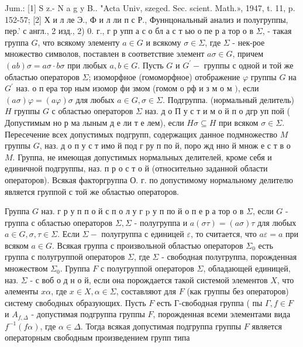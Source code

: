 \documentclass[10pt]{article}
\begin{document}
Jum.: [1] S z.- N a g y B.. "Acta Univ, szeged. Sec. scient. Math.», 1947, t. 11, p. 152-57; [2] Х и л ле Э., Ф и л ли п с Р., Фуннцональный анализ и полугруппы, пер.' с англ., 2 изд., 2) 0. г., г р упп а с о бл а с т ью о пе р а тор о в $\Sigma$, - такая группа $G$, что всякому элементу $a \in G$ и всякому $\sigma \in \Sigma$, где $\Sigma$ - нек-рое множество символов, поставлен в соответствие элемент $a \sigma \in G$, причем $(a b) \sigma=a \sigma \cdot b \sigma$ при любых $a, b \in G$. Пусть $G$ и $G^{\prime}-$ группы с одной и той же областью операторов $\Sigma$; изоморфное (гомоморфное) отображение $\varphi$ группы $G$ на $G^{\prime}$ наз. о п ера тор ным изомор фи змом (гомом о рф и з м о м $)$, если $(a \sigma) \varphi=(a \varphi) \sigma$ для любых $a \in G, \sigma \in \Sigma$. Подгруппа. (нормальный делитель) $H$ группы $G$ с областью операторов $\Sigma$ наз. д о П у с т и м о й п о дгр уп пой ( Допустимым но р ма лыным д е ли т е лем), если $H \sigma \subseteq H$ при всяком $\sigma \in \Sigma$. Пересечение всех допустимых подгрупп, содержащих данное подмножество $M$ группы $G$, наз. д о п у с т имо й под г ру п по й, поро жд нно й множ е с т в о $M$. Группа, не имеющая допустимых нормальных делителей, кроме себя и единичной подгруппы, наз. п р о с т о й (относительно заданной области операторов). Всякая факторгруппа О. г. по допустимому нормальному делителю является группой с той же областью операторов.



Группа $G$ наз. г р у п п о й с п о л у г p у п по й о п е р а тор о в $\Sigma$, если $G$ - группа с областью операторов $\Sigma, \Sigma$ - полугруппа и $a(\sigma \tau)=(a \sigma) \tau$ для любых $a \in G, \sigma, \tau \in \Sigma$. Если $\Sigma-$ полугруппа с единицей $\varepsilon$, то считается, что $a \varepsilon=a$ при всяком $a \in G$. Всякая группа с произвольной областью операторов $\Sigma_{0}$ есть группа с полугруппой операторов $\Sigma$, где $\Sigma$ - свободная полугруппа, порожденная множеством $\Sigma_{0}$. Группа $F$ с полугруппой операторов $\Sigma$, обладающей единицей, наз. $\Sigma$ - с воб о д н о й, если она порождается такой системой элементов $X$, что әлементы $x \alpha$, где $x \in X, \alpha \in \Sigma$, составляют для $F$ (как группы без операторов) систему свободных образующих. Пусть $F$ есть Г-свободная группа ( пы $\Gamma, f \in F$ и $A_{f, \Delta}$ - допустимая подгруппа группы $F$, порожденная всеми элементами вида $f^{-1}(f \alpha)$, где $\alpha \in \Delta$. Тогда всякая допустимая подгруппа группы $F$ является операторным свободным произведением групп типа
\end{document}
